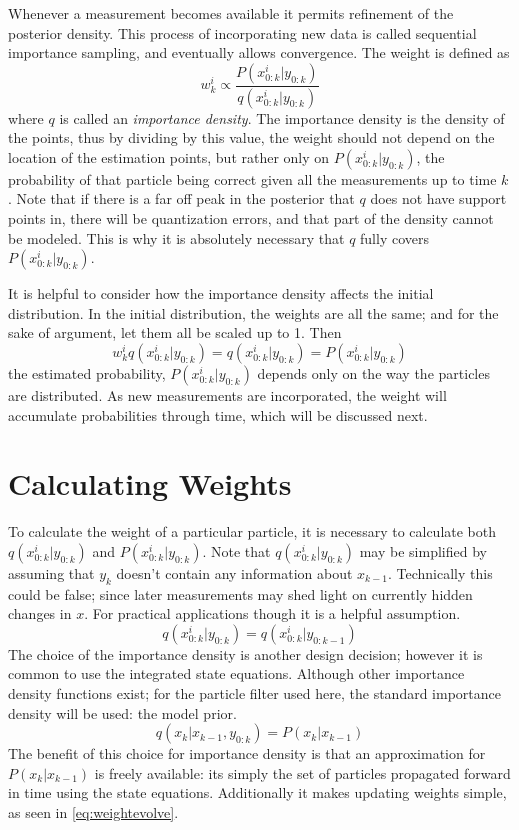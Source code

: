 Whenever a measurement becomes available it permits refinement of the
posterior density.
This process of incorporating new data is called sequential importance sampling,
and eventually allows convergence. The weight is defined as
\begin{equation}
w^i_k \propto \frac{P(x^i_{0:k} | y_{0:k})}{q(x^i_{0:k} | y_{0:k})}
\label{eq:weightfunc}
\end{equation}
where $q$ is called an \emph{importance density}. The importance density
is the density of the points, thus by dividing by this value, the weight
should not depend on the location of the estimation points, but rather
only on $P(x^i_{0:k} | y_{0:k})$, the probability of that particle
being correct given all the measurements up to time $k$. 
Note that if there is a far off peak in
the posterior that $q$ does not have support points in, there will 
be quantization errors, and that part of the density cannot be modeled. This is why
it is absolutely necessary that $q$ fully covers $P(x^i_{0:k} | y_{0:k})$.

It is helpful
to consider how the importance density affects the initial distribution. 
In the initial distribution, the weights are all the same; and for
the sake of argument, let them all be scaled up to 1. Then
\begin{equation}
w^i_k q(x^i_{0:k} | y_{0:k}) = q(x^i_{0:k} | y_{0:k}) = P(x^i_{0:k} | y_{0:k})
\end{equation}
the estimated probability, $P(x^i_{0:k} | y_{0:k})$ depends only on the 
way the particles are distributed. As new measurements are incorporated,
the weight will accumulate probabilities through time, which will be discussed
next. 

\section{Calculating Weights}
To calculate the weight of a particular particle, it is necessary to 
calculate both $q(x^i_{0:k} | y_{0:k})$ and $P(x^i_{0:k} | y_{0:k})$.
Note that $q(x^i_{0:k} | y_{0:k})$ may be simplified by assuming that 
$y_k$ doesn't contain any information about $x_{k-1}$. Technically this 
could be false; since later measurements may shed light on currently hidden
changes in $x$. For practical applications though it is a helpful assumption.
\begin{equation}
q(x^i_{0:k} | y_{0:k}) = q(x^i_{0:k} | y_{0:k-1})
\label{eq:QAssump}
\end{equation}
The choice of the importance density is another design decision; however
it is common to use the integrated state equations. 
Although other importance density functions exist; for the particle filter
used here, the standard importance density will be used: the model
prior.
\begin{equation}
q(x_k | x_{k-1}, y_{0:k}) =  P(x_k | x_{k-1})
\label{eq:ImportanceDensity}
\end{equation}
The benefit of this choice for importance density is that an approximation for
$P(x_k | x_{k-1})$ is freely available: its simply the set of particles propagated
forward in time using the state equations. Additionally it makes
updating weights simple, as seen in \autoref{eq:weightevolve}.

